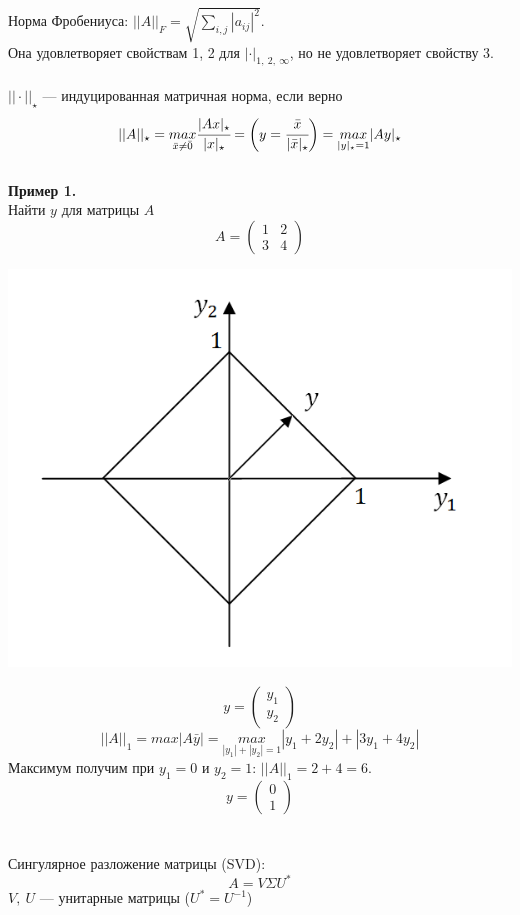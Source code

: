 \documentclass[12pt]{article}
\theoremstyle{definition}
\numberwithin{equation}{section}
\begin{document}
	Норма Фробениуса: $||A||_F=\sqrt{\sum\limits_{i,j}|a_{ij}|^2}$.\\
	Она удовлетворяет свойствам 1, 2 для $|\cdot|_{1,~2,~\infty}$, но не удовлетворяет свойству 3.\\
	\\
	$||\cdot||_{\star}$ --- индуцированная матричная норма, если верно $$||A||_{\star}=\underset{\bar x \neq \bar 0}{max} \cfrac{|Ax|_{\star}}{|x|_{\star}}=\bigg( y=\cfrac{\bar x}{|\bar x|_{\star}} \bigg)=\underset{|y|_{\star}=1}{max}|Ay|_{\star}$$
	\\
	\textbf{Пример 1.}\\
	Найти $y$ для матрицы $A$ \[A=\begin{pmatrix}
	1 & 2\\
	3 & 4
	\end{pmatrix}\]
	\begin{center}
		\includegraphics[scale=0.6]{l8_1.png}\end{center}
	\[y=\begin{pmatrix}
	y_1\\
	y_2
	\end{pmatrix}\]
	$$||A||_1=max|A \bar y|=\underset{|y_1|+|y_2|=1}{max}|y_1+2y_2|+|3y_1+4y_2|$$
	Максимум получим при $y_1=0$ и $y_2=1$: $||A||_1=2+4=6$.
	\[y=\begin{pmatrix}
	0\\
	1
	\end{pmatrix}\]
	~\\ \\
	Сингулярное разложение матрицы (SVD): $$A=V\Sigma U^*$$
	$V, ~U$ --- унитарные матрицы ($U^*=U^{-1}$)
\end{document}
